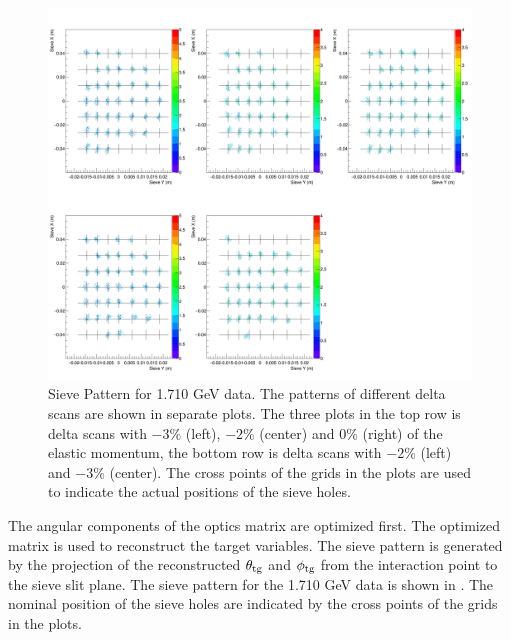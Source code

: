 \begin{figure}[b!]
  \centering
  \includegraphics[width=\textwidth]{figs/sieve-pattern.png}
  \caption[Sieve Pattern for 1.710 GeV data.]{Sieve Pattern for 1.710 GeV data. The patterns of different delta scans are shown in separate plots. The three plots in the top row is delta scans with $-3\%$ (left), $-2\%$ (center) and $0\%$ (right) of the elastic momentum, the bottom row is delta scans with $-2\%$ (left) and $-3\%$ (center). The cross points of the grids in the plots are used to indicate the actual positions of the sieve holes. \label{C6S3F3}}
\end{figure}

The angular components of the optics matrix are optimized first. The optimized matrix is used to reconstruct the target variables. The sieve pattern is generated by the projection of the reconstructed $\theta_{\mathrm{tg}}$ and $\phi_{\mathrm{tg}}$ from the interaction point to the sieve slit plane. The sieve pattern for the 1.710 GeV data is shown in . The nominal position of the sieve holes are indicated by the cross points of the grids in the plots.

